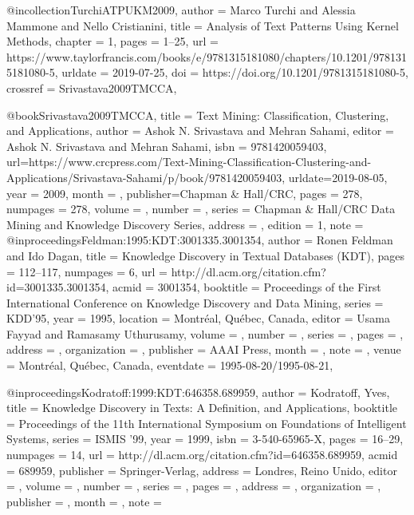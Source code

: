 @incollection{TurchiATPUKM2009,
  author       = {Marco Turchi and Alessia Mammone and Nello Cristianini},
  title        = {{A}nalysis of {T}ext {P}atterns {U}sing {K}ernel {M}ethods},
  chapter      = {1},
  pages        = {1--25},
  url          = {https://www.taylorfrancis.com/books/e/9781315181080/chapters/10.1201/9781315181080-5},
  urldate      = {2019-07-25},
  doi          = {https://doi.org/10.1201/9781315181080-5},
  crossref = {Srivastava2009TMCCA},
}

@book{Srivastava2009TMCCA,
    title = {Text Mining: Classification, Clustering, and Applications},
    author = {Ashok N. Srivastava and Mehran Sahami},
    editor = {Ashok N. Srivastava and Mehran Sahami},
    isbn = {9781420059403},
    url={https://www.crcpress.com/Text-Mining-Classification-Clustering-and-Applications/Srivastava-Sahami/p/book/9781420059403},
    urldate={2019-08-05},
    year = {2009},
    month = {},
    publisher={Chapman \& Hall/CRC},
    pages = {278},
    numpages = {278},
    volume   = {},
    number   = {},
    series   = {Chapman \& Hall/CRC Data Mining and Knowledge Discovery Series},
    address  = {},
    edition  = {1},
    note     = {}
}
@inproceedings{Feldman:1995:KDT:3001335.3001354,
    author = {Ronen Feldman and Ido Dagan},
    title = {{K}nowledge {D}iscovery in {T}extual Databases {(KDT)}},
    pages = {112--117},
    numpages = {6},
    url = {http://dl.acm.org/citation.cfm?id=3001335.3001354},
    acmid = {3001354},
    booktitle = {Proceedings of the First International Conference on Knowledge Discovery and Data Mining},
    series = {KDD'95},
    year = {1995},
    location = {Montréal, Québec, Canada},
    editor		= {Usama Fayyad and Ramasamy Uthurusamy},
    volume		= {},
    number		= {},
    series		= {},
    pages		= {},
    address	= {},
    organization	= {},
    publisher	= {AAAI Press},
    month		= {},
    note		= {},
    venue        = {Montréal, Québec, Canada},
    eventdate    = {1995-08-20/1995-08-21},
} 

@inproceedings{Kodratoff:1999:KDT:646358.689959,
    author = {Kodratoff, Yves},
    title = {{K}nowledge {D}iscovery in {T}exts: {A} {D}efinition, and {A}pplications},
    booktitle = {Proceedings of the 11th International Symposium on Foundations of Intelligent Systems},
    series = {ISMIS '99},
    year = {1999},
    isbn = {3-540-65965-X},
    pages = {16--29},
    numpages = {14},
    url = {http://dl.acm.org/citation.cfm?id=646358.689959},
    acmid = {689959},
    publisher = {Springer-Verlag},
    address = {Londres, Reino Unido},
    editor		= {},
    volume		= {},
    number		= {},
    series		= {},
    pages		= {},
    address	= {},
    organization	= {},
    publisher	= {},
    month		= {},
    note		= {}
} 

